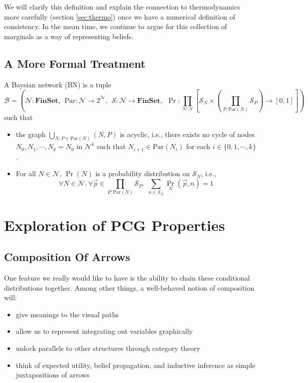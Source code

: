 \documentclass{article}
\begin{document}
	
	We will clarify this definition and explain the connection to thermodynamics more carefully (section \ref{sec:thermo}) once we have a numerical definition of consistency. In the mean time, we continue to argue for this collection of marginals as a way of representing beliefs.
	
	\subsection{A More Formal Treatment}
	\begin{defn}
		A Baysian network (BN) is a tuple
		\[
		\mathcal B = \left(\mathcal N : \mathbf{FinSet}, ~~\mathrm{Par}: \mathcal N \to 2^{\mathcal N},~~ \mathcal S: \mathcal N \to \mathbf{FinSet},~~\Pr: \prod_{N : \mathcal N}  \left[ \mathcal S_N \times \left(\prod_{P : \mathrm{Par}(N)} \mathcal S_P\right)  \to [0,1] \right] \right)
		\]
		such that
		\begin{itemize}[nosep]
			\item the graph $\bigcup_{N, P \in \mathrm{Par}(N)}(N, P)$ is acyclic, i.e., there exists no cycle of nodes $N_0, N_1, \cdots, N_k = N_0$ in $\mathcal N^k$ such that $N_{i+1} \in \mathrm{Par}(N_i)$ for each $i \in \{0, 1, \cdots, k\}$.
			\item For all $N \in \mathcal N$, $\Pr(N)$ is a probability distribution on $\mathcal S_N$, i.e., 
			\[ \forall N\in \mathcal N.~\forall \vec{p} \in {\prod_{P : \mathrm{Par}(N)} \mathcal S_P}.~~ \sum_{n \in \mathcal S_{N}} \Pr_N(\vec{p}, n) = 1\]
		\end{itemize}
	\end{defn}
	
	\section{Exploration of PCG Properties}
	\subsection{Composition Of Arrows} \label{sec:composition}
	One feature we really would like to have is the ability to chain these conditional distributions together. Among other things, a well-behaved notion of composition will:
	\begin{itemize}[nosep]
		\item give meanings to the visual paths
		\item allow us to represent integrating out variables graphically
		\item unlock parallels to other structures through category theory
		\item think of expected utility, belief propagation, and inductive inference as simple juxtapositions of arrows
	\end{itemize} 
	
\end{document}
